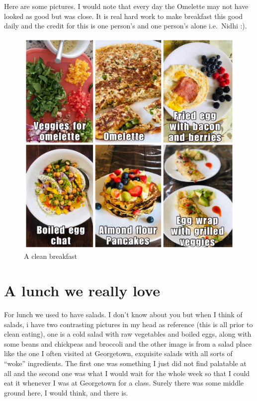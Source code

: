 \documentclass[
  oneside]{book}
\begin{document}
Here are some pictures. I would note that every day the Omelette may not have looked as good but was close. It is real hard work to make breakfast this good daily and the credit for this is one person's and one person's alone i.e.~Nidhi :).

\begin{figure}
\centering
\includegraphics{pictures/breakfast.JPG}
\caption{A clean breakfast}
\end{figure}

\pagebreak

\hypertarget{a-lunch-we-really-love}{%
\section{A lunch we really love}\label{a-lunch-we-really-love}}

For lunch we used to have salads. I don't know about you but when I think of salads, i have two contrasting pictures in my head as reference (this is all prior to clean eating), one is a cold salad with raw vegetables and boiled eggs, along with some beans and chickpeas and broccoli and the other image is from a salad place like the one I often visited at Georgetown, exquisite salads with all sorts of ``woke'' ingredients. The first one was something I just did not find palatable at all and the second one was what I would wait for the whole week so that I could eat it whenever I was at Georgetown for a class. Surely there was some middle ground here, I would think, and there is.
\end{document}
